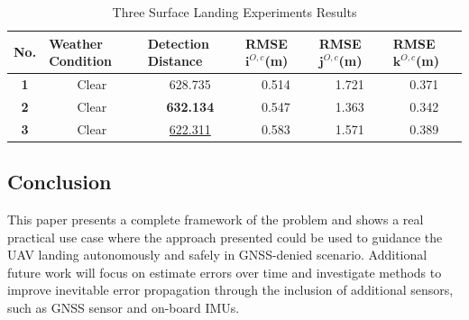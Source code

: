 \begin{table}[!th]
	\centering
	\caption{Three Surface Landing Experiments Results}
	\label{lab:three_ship_landing}
	\begin{tabular}{cccccc}
		\hline
		\multicolumn{1}{l}{\textbf{No.}} & \multicolumn{1}{l}{\textbf{Weather Condition}} & \multicolumn{1}{l}{\textbf{Detection Distance}} & \multicolumn{1}{l}{\textbf{RMSE $\mathbf{i}^{O,c}$(m)}} & \multicolumn{1}{l}{\textbf{RMSE $\mathbf{j}^{O,c}$(m)}} & \multicolumn{1}{l}{\textbf{RMSE $\mathbf{k}^{O,c}$(m)}} \\ \hline
		\textbf{1} & Clear & 628.735 & 0.514 & 1.721 & 0.371 \\
		\textbf{2} & Clear & \textbf{632.134} & 0.547 & 1.363 & 0.342 \\
		\textbf{3} & Clear & \underline{622.311} & 0.583 & 1.571 & 0.389 \\ \hline
	\end{tabular}
\end{table}


\subsection{Conclusion}
This paper presents a complete framework of the problem and shows a real practical use case where the approach
presented could be used to guidance the UAV landing autonomously and safely in GNSS-denied scenario. Additional future work will focus on estimate errors over time and investigate methods to improve inevitable error propagation through the inclusion of additional sensors, such as GNSS sensor and on-board IMUs.






